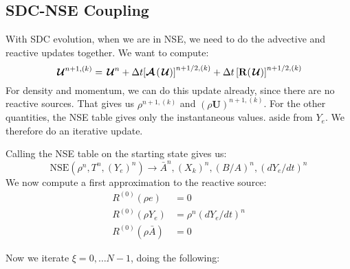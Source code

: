 \documentclass[times,modern]{aastex63}
\newcommand{\Ub}{\mathbf{U}}
\newcommand{\Uc}{{\,\bm{\mathcal{U}}}}
\newcommand{\Rb}{{\bf R}}
\newcommand{\Adv}[1]{{\left [\boldsymbol{\mathcal{A}} \left(#1\right)\right]}}
\newcommand{\nse}[1]{{\mathrm{NSE}( #1 )}}
\begin{document}
\subsection{SDC-NSE Coupling}

With SDC evolution, when we are in NSE, we need to do the advective
and reactive updates together.  We want to compute:
\begin{equation}
\Uc^{n+1,(k)} = \Uc^n + \Delta t \Adv{\Uc}^{n+1/2,(k)} + \Delta t \left [\Rb (\Uc) \right ]^{n+1/2,(k)}
\end{equation}
For density and momentum, we can do this update already, since there
are no reactive sources.  That gives us $\rho^{n+1,(k)}$ and $(\rho
\Ub)^{n+1,(k)}$.  For the other quantities, the NSE table gives only the
instantaneous values. aside from $Y_e$.  We therefore do an iterative
update.

Calling the NSE table on the starting state gives us:
\begin{equation}
\nse{\rho^n, T^n, (Y_e)^n} \rightarrow \bar{A}^n, (X_k)^n, (B/A)^n, (dY_e/dt)^n
\end{equation}
We now compute a first approximation to the reactive source:
\begin{align}
R^{(0)}(\rho e) &= 0 \\
R^{(0)}(\rho Y_e) &= \rho^n (dY_e/dt)^n \\
R^{(0)}(\rho \bar{A}) &= 0
\end{align}

Now we iterate $\xi = 0, \ldots N-1$, doing the following:
\end{document}
